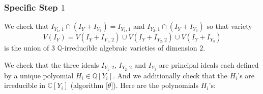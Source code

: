 \subsubsection{{\bf Specific Step $1$}}
We check that $I_{Y_{1} ,1} \cap ( I_{Y} +I_{Y_{3}} ) =I_{Y_{1} ,1}$ and
$I_{Y_{2} ,1} \cap ( I_{Y} +I_{Y_{3}} )$ so that variety
$$V ( I_{Y} ) =V ( I_{Y} +I_{Y_{1} ,2} ) \cup V ( I_{Y} +I_{Y_{2} ,2}
  ) \cup V ( I_{Y} +I_{Y_{3}} )$$ is the union of $3$ $\mathbb{Q}$-irreducible
  algebraic varieties of dimension $2$. 
  
 We check that the three ideals $I_{Y_1,2}$, $I_{Y_2,2}$ and $I_{Y_3}$ are
  principal ideals each defined by a unique polyomial $H_{i}
\in \mathbb{Q} [ Y_{i} ]$. And we additionally check that the $H_i$'s are irreducible in $\mathbb{C} [ Y_{i} ]$ (algorithm [$\theta$]). Here are the polynomials $H_i$'s:
